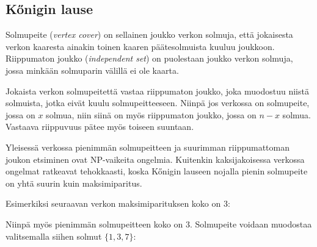 \subsection{Kőnigin lause}

Solmupeite (\textit{vertex cover}) on sellainen joukko
verkon solmuja, että jokaisesta verkon kaaresta ainakin
toinen kaaren päätesolmuista kuuluu joukkoon.
Riippumaton joukko (\textit{independent set})
on puolestaan joukko verkon solmuja,
jossa minkään solmuparin välillä ei ole kaarta.

Jokaista verkon solmupeitettä vastaa riippumaton
joukko, joka muodostuu niistä solmuista,
jotka eivät kuulu solmupeitteeseen.
Niinpä jos verkossa on solmupeite,
jossa on $x$ solmua, niin siinä on myös
riippumaton joukko, jossa on $n-x$ solmua.
Vastaava riippuvuus pätee myös toiseen suuntaan.

Yleisessä verkossa pienimmän solmupeitteen ja
suurimman riippumattoman joukon etsiminen ovat
NP-vaikeita ongelmia.
Kuitenkin kaksijakoisessa verkossa ongelmat ratkeavat tehokkaasti,
koska Kőnigin lauseen nojalla pienin solmupeite on yhtä suurin
kuin maksimiparitus.

Esimerkiksi seuraavan verkon maksimiparituksen koko on 3:

\begin{center}
\end{center}

Niinpä myös pienimmän solmupeitteen koko on 3.
Solmupeite voidaan muodostaa valitsemalla siihen
solmut $\{1,3,7\}$:

\begin{center}
\end{center}


